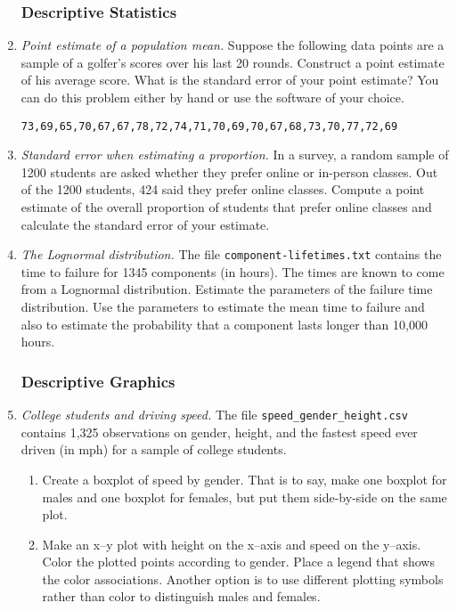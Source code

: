 \begin{enumerate}
\subsubsection*{Descriptive Statistics}

\item \emph{Point estimate of a population mean.} Suppose the
  following data points are a sample of a golfer's scores over his
  last 20 rounds.  Construct a point estimate of his average
  score. What is the standard error of your point estimate? You can do
  this problem either by hand or use the software of your choice.
\begin{verbatim}
73,69,65,70,67,67,78,72,74,71,70,69,70,67,68,73,70,77,72,69
\end{verbatim}
  
\item \emph{Standard error when estimating a proportion.} In a survey, a
  random sample of \num{1200} students are asked whether they prefer
  online or in-person classes.  Out of the \num{1200} students,
  \num{424} said they prefer online classes. Compute a point estimate
  of the overall proportion of students that prefer online classes and
  calculate the standard error of your estimate.

\item \emph{The Lognormal distribution.}  The file
  \texttt{component-lifetimes.txt} contains the time to failure for
  \num{1345} components (in hours). The times are known to come from a
  Lognormal distribution. Estimate the parameters of the failure time
  distribution. Use the parameters to estimate the mean time to
  failure and also to estimate the probability that a component lasts
  longer than 10,000 hours.


\subsubsection*{Descriptive Graphics}

\item \emph{College students and driving speed.} The file
  \texttt{speed\_gender\_height.csv} contains 1,325 observations on
  gender, height, and the fastest speed ever driven (in mph) for a
  sample of college students.

\begin{enumerate}
\item Create a boxplot of speed by gender. That is to say, make one
  boxplot for males and one boxplot for females, but put them
  side-by-side on the same plot.
\item Make an x--y plot with height on the x--axis and speed on the
  y--axis. Color the plotted points according to gender. Place a
  legend that shows the color associations. Another option is to use
  different plotting symbols rather than color to distinguish males
  and females.
\end{enumerate}

\end{enumerate}
